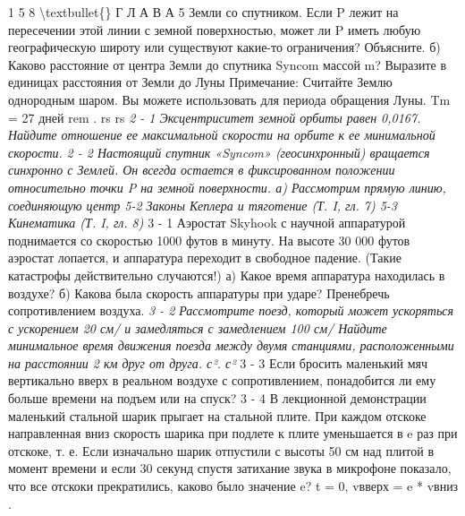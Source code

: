 \documentclass[10pt,oneside]{article}
\begin{document}
1 5 8 \textbackslash{}textbullet\{\} Г Л А В А  5 Земли со спутником. Если P лежит на пересечении этой линии с земной поверхностью, может ли P иметь любую географическую широту или существуют какие-то ограничения? Объясните. б) Каково расстояние от центра Земли до спутника Syncom массой m? Выразите в единицах расстояния от Земли до Луны Примечание: Считайте Землю однородным шаром. Вы можете использовать для периода обращения Луны. Tm = 27 дней rem . rs rs \emph{ 2 - 1 Эксцентриситет земной орбиты равен 0,0167. Найдите отношение ее максимальной скорости на орбите к ее минимальной скорости. } \emph{ 2 - 2 Настоящий спутник «Syncom» (геосинхронный) вращается синхронно с Землей. Он всегда остается в фиксированном положении относительно точки P на земной поверхности. а) Рассмотрим прямую линию, соединяющую центр 5-2 Законы Кеплера и тяготение (Т. I, гл. 7) 5-3 Кинематика (Т. I, гл. 8) } 3 - 1 Аэростат Skyhook с научной аппаратурой поднимается со скоростью 1000 футов в минуту. На высоте 30 000 футов аэростат лопается, и аппаратура переходит в свободное падение. (Такие катастрофы действительно случаются!) а) Какое время аппаратура находилась в воздухе? б) Какова была скорость аппаратуры при ударе? Пренебречь сопротивлением воздуха. \emph{ 3 - 2 Рассмотрите поезд, который может ускоряться с ускорением 20 см/ и замедляться с замедлением 100 см/ Найдите минимальное время движения поезда между двумя станциями, расположенными на расстоянии 2 км друг от друга. с². с² } 3 - 3 Если бросить маленький мяч вертикально вверх в реальном воздухе с сопротивлением, понадобится ли ему больше времени на подъем или на спуск? \emph{ } 3 - 4 В лекционной демонстрации маленький стальной шарик прыгает на стальной плите. При каждом отскоке направленная вниз скорость шарика при подлете к плите уменьшается в e раз при отскоке, т. е. Если изначально шарик отпустили с высоты 50 см над плитой в момент времени и если 30 секунд спустя затихание звука в микрофоне показало, что все отскоки прекратились, каково было значение e? t = 0, vвверх = e * vвниз .\par
\end{document}
